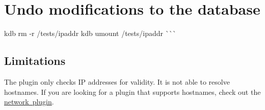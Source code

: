 \hypertarget{autotoc_md323_autotoc_md338}{}\section{Undo modifications to the database}\label{autotoc_md323_autotoc_md338}
kdb rm -\/r /tests/ipaddr kdb umount /tests/ipaddr \`{}\`{}\`{}\hypertarget{autotoc_md323_autotoc_md339}{}\subsection{Limitations}\label{autotoc_md323_autotoc_md339}
The plugin only checks IP addresses for validity. It is not able to resolve hostnames. If you are looking for a plugin that supports hostnames, check out the \mbox{\hyperlink{autotoc_md484_src_plugins_network_README_md}{network plugin}}. 